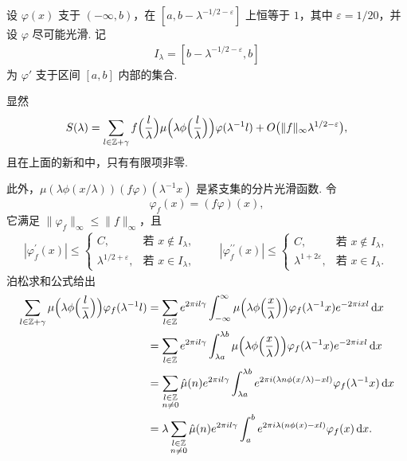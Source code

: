 设 $\varphi(x)$ 支于 $(-\infty, b)$，在 $[a, b - \lambda^{-1/2-\varepsilon}]$ 上恒等于 $1$，其中 $\varepsilon = 1/20$，并设 $\varphi$ 尽可能光滑. 记
\begin{align*}
  I_{\lambda}=[b-\lambda^{-1/2-\varepsilon},b]
\end{align*}
为 $\varphi'$ 支于区间 $[a, b]$ 内部的集合.

显然
\begin{align*}
  S(\lambda)=\sum_{l\in\mathbb{Z}+\gamma}f\Big(\frac{l}{\lambda}\Big)\mu\Big(\lambda\phi\Big(\frac{l}{\lambda}\Big)\Big)\varphi(\lambda^{-1}l)
  +O\bigl(\|f\|_{\infty}\lambda^{1/2-\varepsilon}\bigr),
\end{align*}
且在上面的新和中，只有有限项非零.

此外，$\mu(\lambda\phi(x/\lambda))(f\varphi)(\lambda^{-1}x)$ 是紧支集的分片光滑函数. 令
\begin{equation}\label{eq:9.14}
  \varphi_{f}(x)=(f\varphi)(x),
\end{equation}
它满足 $\|\varphi_f\|_\infty \leq \|f\|_\infty$，且
\begin{align*}
  |\varphi_{f}^{\prime}(x)|\leq\begin{cases}
    C, & \text{若 } x\notin I_{\lambda},\\
    \lambda^{1/2+\varepsilon}, & \text{若 } x\in I_{\lambda},
  \end{cases}
  \qquad
  |\varphi_{f}^{\prime\prime}(x)|\leq\begin{cases}
    C, & \text{若 } x\notin I_{\lambda},\\
    \lambda^{1+2\varepsilon}, & \text{若 } x\in I_{\lambda}.
  \end{cases}
\end{align*}
泊松求和公式给出
\begin{align*}
  \sum_{l\in\mathbb{Z}+\gamma}\mu\Big(\lambda\phi\Big(\frac{l}{\lambda}\Big)\Big)\varphi_{f}(\lambda^{-1}l)
  &=\sum_{l\in\mathbb{Z}}e^{2\pi il\gamma}\int_{-\infty}^{\infty}\mu\Big(\lambda\phi\Big(\frac{x}{\lambda}\Big)\Big)\varphi_{f}(\lambda^{-1}x)e^{-2\pi i x l}\,\mathrm{d}x\\
  &=\sum_{l\in\mathbb{Z}}e^{2\pi il\gamma}\int_{\lambda a}^{\lambda b}\mu\Big(\lambda\phi\Big(\frac{x}{\lambda}\Big)\Big)\varphi_{f}(\lambda^{-1}x)e^{-2\pi i x l}\,\mathrm{d}x\\
  &=\sum_{\substack{l\in\mathbb{Z}\\ n\neq 0}}\hat{\mu}(n)e^{2\pi il\gamma}
   \int_{\lambda a}^{\lambda b}e^{2\pi i(\lambda n\phi(x/\lambda)-xl)}\varphi_{f}(\lambda^{-1}x)\,\mathrm{d}x\\
  &=\lambda\sum_{\substack{l\in\mathbb{Z}\\ n\neq 0}}\hat{\mu}(n)e^{2\pi il\gamma}
   \int_{a}^{b}e^{2\pi i\lambda(n\phi(x)-xl)}\varphi_{f}(x)\,\mathrm{d}x.
\end{align*}
